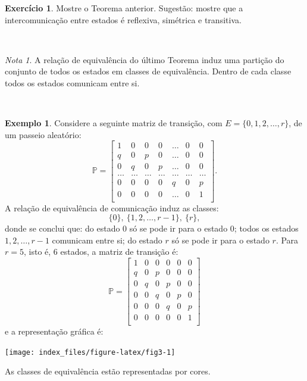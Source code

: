 \documentclass[
  11pt,
  a4paper,
]{book}
\theoremstyle{definition}
\theoremstyle{definition}
\newtheorem{example}{Exemplo}[chapter]
\theoremstyle{definition}
\newtheorem{exercise}{Exercício}[chapter]
\theoremstyle{definition}
\theoremstyle{remark}
\newtheorem*{remark}{Nota }
\begin{document}
\begin{exercise}
\leavevmode

Mostre o Teorema anterior. Sugestão: mostre que a intercomunicação entre estados é reflexiva, simétrica e transitiva.

\end{exercise}

\(\,\)

\begin{remark}
A relação de equivalência do último Teorema induz uma partição do conjunto de todos os estados em classes de equivalência. Dentro de cada classe todos os estados comunicam entre si.
\end{remark}

\(\,\)

\begin{example}
Considere a seguinte matriz de transição, com \(E=\{0,1,2,\dots,r\}\), de um passeio aleatório:
\[\mathbb{P}= \begin{bmatrix}
    1 & 0 & 0 & 0  & \dots & 0 & 0 \\
    q & 0 & p & 0  & \dots & 0 & 0 \\
    0 & q & 0 & p  & \dots & 0 & 0 \\
    \dots & \dots & \dots & \dots  & \dots & \dots & \dots \\
    0 & 0 & 0 & 0  & q & 0 & p \\
    0 & 0 & 0 & 0  & \dots & 0 & 1 \\
\end{bmatrix}.\]
A relação de equivalência de comunicação induz as classes:
\[\{0\}, ~ \{1,2,\dots,r-1\}, ~\{r\},\]
donde se conclui que: do estado \(0\) só se pode ir para o estado \(0\); todos os estados \(1,2,\dots,r-1\) comunicam entre si; do estado \(r\) só se pode ir para o estado \(r\). Para \(r=5\), isto é, 6 estados, a matriz de transição é:
\[
\mathbb{P} =
\begin{bmatrix}
1 & 0 & 0 & 0 & 0 & 0 \\
q & 0 & p & 0 & 0 & 0 \\
0 & q & 0 & p & 0 & 0 \\
0 & 0 & q & 0 & p & 0 \\
0 & 0 & 0 & q & 0 & p \\
0 & 0 & 0 & 0 & 0 & 1 \\
\end{bmatrix}
\]
e a representação gráfica é:

\begin{center}\texttt{[image: index\_files/figure-latex/fig3-1]} \end{center}

As classes de equivalência estão representadas por cores.
\end{example}
\end{document}
